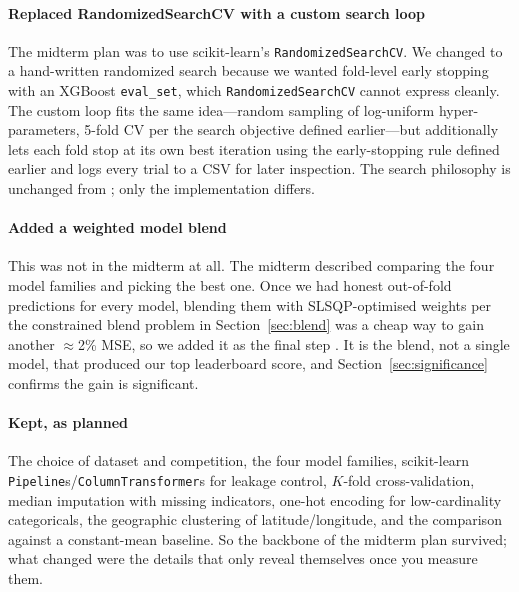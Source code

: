 \documentclass[journal]{IEEEtran}
\begin{document}
\paragraph{Replaced RandomizedSearchCV with a custom search loop} The midterm
plan was to use scikit-learn's \texttt{RandomizedSearchCV}. We changed to a
hand-written randomized search because we wanted fold-level early stopping with an
XGBoost \texttt{eval\_set}, which \texttt{RandomizedSearchCV} cannot express
cleanly. The custom loop fits the same idea---random sampling of log-uniform
hyper-parameters, 5-fold CV per the search objective defined earlier---but additionally lets each
fold stop at its own best iteration using the early-stopping rule defined earlier and logs every trial to
a CSV for later inspection. The search philosophy is unchanged from
\cite{bergstra2012random}; only the implementation differs.

\paragraph{Added a weighted model blend} This was not in the midterm at all. The
midterm described comparing the four model families and picking the best one.
Once we had honest out-of-fold predictions for every model, blending them with
SLSQP-optimised weights per the constrained blend problem in Section~\ref{sec:blend} was a cheap
way to gain another $\approx$2\% MSE, so we added it as the final step
\cite{wolpert1992stacked}. It is the blend, not a single model, that produced our
top leaderboard score, and Section~\ref{sec:significance} confirms the gain is
significant.

\paragraph{Kept, as planned} The choice of dataset and competition, the four
model families, scikit-learn \texttt{Pipeline}s/\texttt{ColumnTransformer}s for
leakage control, $K$-fold cross-validation, median imputation with missing
indicators, one-hot encoding for low-cardinality categoricals, the geographic
clustering of latitude/longitude, and the comparison against a constant-mean
baseline. So the backbone of the midterm plan survived; what changed were the
details that only reveal themselves once you measure them.

\end{document}
